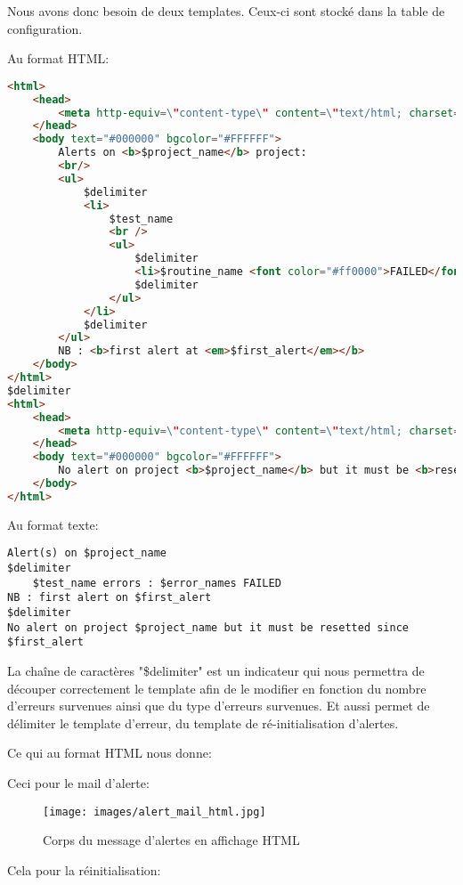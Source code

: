 Nous avons donc besoin de deux templates. Ceux-ci sont stocké dans la table de configuration.

Au format HTML:

\begin{lstlisting}[language=HTML]
<html>
    <head>
        <meta http-equiv=\"content-type\" content=\"text/html; charset=ISO-8859-1\">
    </head>
    <body text="#000000" bgcolor="#FFFFFF">
        Alerts on <b>$project_name</b> project:
        <br/>
        <ul>
            $delimiter
            <li>
                $test_name
                <br />
                <ul>
                    $delimiter
                    <li>$routine_name <font color="#ff0000">FAILED</font></li>
                    $delimiter
                </ul>
            </li>
            $delimiter
        </ul>
        NB : <b>first alert at <em>$first_alert</em></b>
    </body>
</html>
$delimiter
<html>
    <head>
        <meta http-equiv=\"content-type\" content=\"text/html; charset=ISO-8859-1\">
    </head>
    <body text="#000000" bgcolor="#FFFFFF">
        No alert on project <b>$project_name</b> but it must be <b>resetted</b> since <b>$first_alert</b> 
    </body>
</html>
\end{lstlisting}

\newpage

Au format texte:

\begin{lstlisting}
Alert(s) on $project_name
$delimiter
    $test_name errors : $error_names FAILED
NB : first alert on $first_alert
$delimiter
No alert on project $project_name but it must be resetted since $first_alert 
\end{lstlisting}

La chaîne de caractères "\$delimiter" est un indicateur qui nous permettra de découper correctement le template afin de le modifier en fonction du nombre d'erreurs survenues ainsi que du type d'erreurs survenues. Et aussi permet de délimiter le template d'erreur, du template de ré-initialisation d'alertes.

Ce qui au format HTML nous donne:

Ceci pour le mail d'alerte:

\begin{figure}[h!]
	\centering
	\texttt{[image: images/alert\_mail\_html.jpg]}
	\caption{Corps du message d'alertes en affichage HTML}
\end{figure}

Cela pour la réinitialisation:


